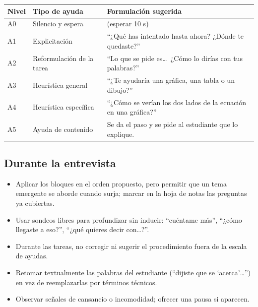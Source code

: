 \documentclass[11pt,letterpaper]{article}
\newcounter{preg}
\begin{document}
\begin{center}
\small
\begin{tabularx}{\linewidth}{@{}p{1.3cm}p{3.3cm}L@{}}
\toprule
\textbf{Nivel} & \textbf{Tipo de ayuda} & \textbf{Formulación sugerida}\\
\midrule
A0 & Silencio y espera & (esperar 10 s) \\
A1 & Explicitación & ``¿Qué has intentado hasta ahora? ¿Dónde te quedaste?''\\
A2 & Reformulación de la tarea & ``Lo que se pide es\ldots\ ¿Cómo lo dirías con tus palabras?''\\
A3 & Heurística general & ``¿Te ayudaría una gráfica, una tabla o un dibujo?''\\
A4 & Heurística específica & ``¿Cómo se verían los dos lados de la ecuación en una gráfica?''\\
A5 & Ayuda de contenido & Se da el paso y se pide al estudiante que lo explique.\\
\bottomrule
\end{tabularx}
\end{center}

\subsection{Durante la entrevista}
\begin{itemize}
  \item Aplicar los bloques en el orden propuesto, pero permitir que un tema emergente se aborde cuando surja; marcar en la hoja de notas las preguntas ya cubiertas.
  \item Usar sondeos libres para profundizar sin inducir: ``cuéntame más'', ``¿cómo llegaste a eso?'', ``¿qué quieres decir con\ldots?''.
  \item Durante las tareas, no corregir ni sugerir el procedimiento fuera de la escala de ayudas.
  \item Retomar textualmente las palabras del estudiante (``dijiste que se `acerca'\ldots'') en vez de reemplazarlas por términos técnicos.
  \item Observar señales de cansancio o incomodidad; ofrecer una pausa si aparecen.
\end{itemize}
\end{document}
